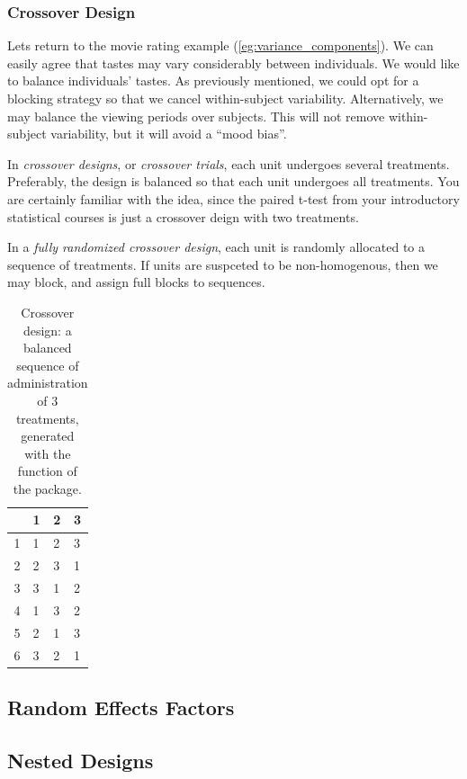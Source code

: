 \subsubsection{Crossover Design}
Lets return to the movie rating example (\ref{eg:variance_components}).
We can easily agree that tastes may vary considerably between individuals. 
We would like to balance individuals' tastes.
As previously mentioned, we could opt for a blocking strategy so that we cancel within-subject variability.
Alternatively, we may balance the viewing periods over subjects. 
This will not remove within-subject variability, but it will avoid a ``mood bias''.

In \emph{crossover designs}, or \emph{crossover trials}, each unit undergoes several treatments.
Preferably, the design is balanced so that each unit undergoes all treatments.
You are certainly familiar with the idea, since the paired t-test from your introductory statistical courses is just a crossover deign with two treatments.

In a \emph{fully randomized crossover design}, each unit is randomly allocated to a sequence of treatments.
If units are suspceted to be non-homogenous, then we may block, and assign full blocks to sequences.
\begin{table}[ht]
\centering
\begin{tabular}{rlll}
  \hline
 & 1 & 2 & 3 \\ 
  \hline
1 & 1 & 2 & 3 \\ 
  2 & 2 & 3 & 1 \\ 
  3 & 3 & 1 & 2 \\ 
  4 & 1 & 3 & 2 \\ 
  5 & 2 & 1 & 3 \\ 
  6 & 3 & 2 & 1 \\ 
   \hline
\end{tabular}
\label{tab:crossover}
\caption{Crossover design: a balanced sequence of administration of $3$ treatments, generated with the  function of the  \R package. }
\end{table}



\subsection{Random Effects Factors}



\subsection{Nested Designs}


